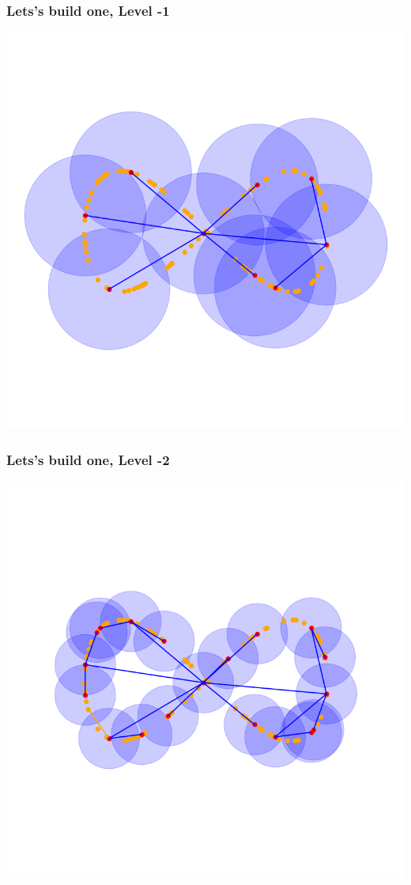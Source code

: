 \documentclass{beamer}
\begin{document}
\begin{frame}
\frametitle{Lets's build one, Level -1}
\begin{center}
    \includegraphics[scale=0.4]{2d_vis_-1.png}
\end{center}
\end{frame}

\begin{frame}
\frametitle{Lets's build one, Level -2}
\begin{center}
    \includegraphics[scale=0.4]{2d_vis_-2.png}
\end{center}
\end{frame}
\end{document}
